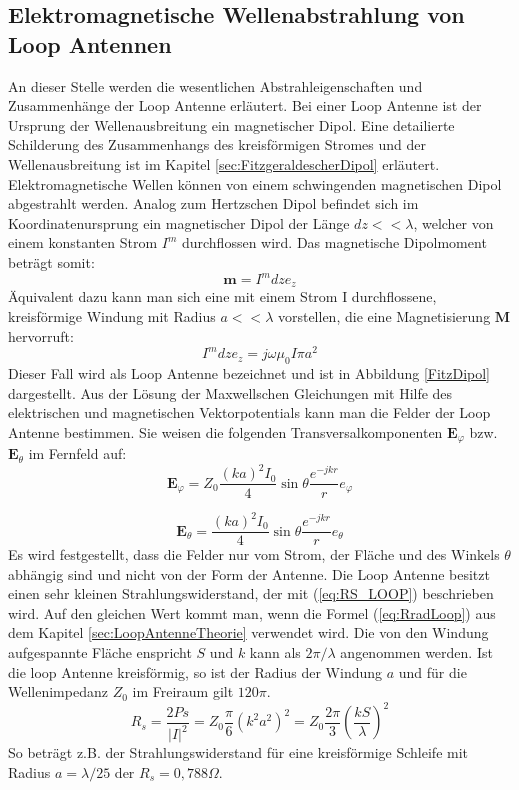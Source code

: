\subsection{Elektromagnetische Wellenabstrahlung von Loop Antennen}
An dieser Stelle werden die wesentlichen Abstrahleigenschaften und Zusammenhänge der Loop Antenne erläutert.
Bei einer Loop Antenne ist der Ursprung der Wellenausbreitung ein magnetischer Dipol. Eine detailierte Schilderung des Zusammenhangs des kreisförmigen Stromes und der Wellenausbreitung ist im Kapitel \ref{sec:FitzgeraldescherDipol} erläutert. \\
Elektromagnetische Wellen können  von einem schwingenden magnetischen Dipol
abgestrahlt werden. Analog zum Hertzschen Dipol befindet sich im Koordinatenursprung
ein magnetischer Dipol der Länge $dz<<\lambda$, welcher von einem konstanten
Strom $I^{m}$ durchflossen wird. Das magnetische Dipolmoment beträgt somit:
\begin{equation}
\textbf{m}=I^{m}dze_z
\end{equation}
Äquivalent dazu kann man sich eine mit einem Strom I durchflossene, kreisförmige Windung mit Radius $a<<\lambda$ vorstellen, die eine Magnetisierung $\textbf{M}$ hervorruft:
\begin{equation}
I^{m}dze_{z}=j\omega\mu_{0}I\pi a^{2}
\end{equation}
Dieser Fall wird als Loop Antenne bezeichnet und ist in Abbildung \ref{FitzDipol} dargestellt. Aus der Lösung der Maxwellschen Gleichungen mit Hilfe des elektrischen und
magnetischen Vektorpotentials kann man die Felder der Loop Antenne bestimmen.
Sie weisen die folgenden Transversalkomponenten $\textbf{E}_{\varphi}$ bzw.$\textbf{E}_{\theta}$ im Fernfeld auf:
\begin{equation}
\textbf{E}_{\varphi}=Z_{0}\dfrac{(ka)^2I_{0}}{4}\sin \theta \dfrac{e^{-jkr}}{r} e_{\varphi}
\end{equation}

\begin{equation}
\textbf{E}_{\theta}=\dfrac{(ka)^2I_{0}}{4}\sin \theta \dfrac{e^{-jkr}}{r} e_{\theta}
\end{equation}
Es wird festgestellt, dass die Felder nur vom Strom, der Fläche und des Winkels $\theta$ abhängig sind
und nicht von der Form der Antenne. 
Die Loop Antenne besitzt einen sehr kleinen Strahlungswiderstand, der mit (\ref{eq:RS_LOOP}) beschrieben wird. Auf den gleichen Wert kommt man, wenn die Formel (\ref{eq:RradLoop}) aus dem Kapitel \ref{sec:LoopAntenneTheorie} verwendet wird. Die von den Windung aufgespannte Fläche enspricht $S$  und $k$ kann als $2\pi/\lambda$ angenommen werden. Ist die loop Antenne kreisförmig, so ist der Radius der Windung $a$ und für die Wellenimpedanz $Z_0$ im Freiraum gilt $120\pi$.
\begin{equation}\label{eq:RS_LOOP}
R_{s}=\dfrac{2Ps}{|I|^{2}}=Z_{0}\dfrac{\pi}{6}(k^{2}a^{2})^{2}=Z_{0}\dfrac{2\pi}{3}\left(\dfrac{kS}{\lambda}\right)^{2} 
\end{equation}
So beträgt z.B. der Strahlungswiderstand für eine kreisförmige Schleife mit Radius $a = \lambda/25$ der  $R_{s} = 0,788\Omega$.


